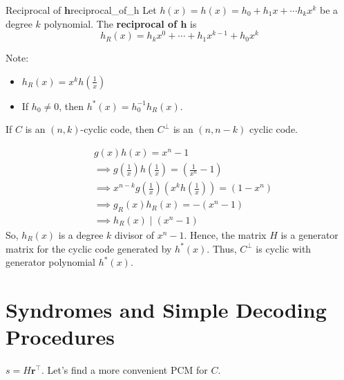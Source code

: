 \begin{Definition}{Reciprocal of $\symbf{h}$}{reciprocal_of_h}
    Let $ h(x)=h(x)=h_{0}+h_{1} x+\cdots h_k x^{k} $ be a degree $ k $
    polynomial. The \textbf{reciprocal of $\symbf{h}$} is
    \[ h_{R}(x)=h_k x^{0}+\cdots+h_{1}x^{k-1}+h_{0}x^{k} \]
\end{Definition}

Note:
\begin{itemize}
    \item $ h_R(x)=x^k h\left( \frac{1}{x} \right) $
    \item If $ h_0\neq 0 $, then $ h^*(x)=h_{0}^{-1}h_R(x) $.
\end{itemize}

\begin{Theorem}{}{}
    If $ C $ is an $ (n,k) $-cyclic code, then $ C^{\perp} $ is an
    $ (n,n-k) $ cyclic code.
\end{Theorem}

\begin{Proof}{}{}
\begin{align*}
     & g(x)h(x)=x^n-1                                                                                   \\
     & \implies g\left( \frac{1}{x} \right)h\left( \frac{1}{x}  \right)= \left( \frac{1}{x^n}-1 \right) \\
     & \implies x^{n-k}g\left( \frac{1}{x}  \right)\left( x^k h\left( \frac{1}{x} \right) \right)=
    (1-x^n)                                                                                             \\
     & \implies g_R(x)h_R(x)=-(x^n-1)                                                                   \\
     & \implies h_R(x)\mid (x^n-1)
\end{align*}
So, $ h_R(x) $ is a degree $ k $ divisor of $ x^n-1 $. Hence, the matrix
$ H $ is a generator matrix for the cyclic code generated by $ h^*(x) $.
Thus, $ C^{\perp} $ is cyclic with generator polynomial $ h^*(x) $.
\end{Proof}

\section{Syndromes and Simple Decoding Procedures}
$ s=H\symbf{r}^\top $. Let's find a more convenient PCM for $ C $.

